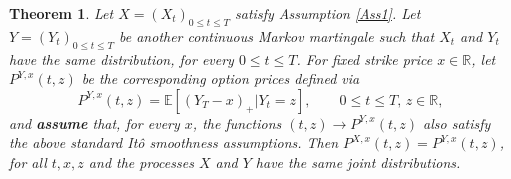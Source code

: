 \documentclass[11pt,a4paper]{article}%
\def\E{{\mathbb E}}
\def\R{{\mathbb R}}
\newtheorem{theorem}{Theorem}[section]
\numberwithin{equation}{section}
\begin{document}


\begin{theorem}\label{baby}
Let $X=(X_t)_{0\le t\le T}$ satisfy Assumption \ref{Ass1}.
Let $Y=(Y_t)_{0\le t\le T}$ be another continuous Markov martingale such that $X_t$ and $Y_t$ have the same distribution, for every $0 \le t \le  T$.
For fixed strike price $x \in \R$, let  $P^{Y,x}(t,z)$ be the corresponding option prices defined via
\begin{equation} \label{condadd'}
P^{Y,x}(t,z) = \E [(Y_T -x)_+|Y_t=z],   \qquad 0 \le t\le T, \, z \in \R,
\end{equation}
and {\bf assume} that, for every $x$, the functions $(t,z) \to P^{Y,x}(t,z)$ also satisfy the above standard It\^o smoothness assumptions.
Then $P^{X,x}(t,z) = P^{Y,x}(t,z)$, for all $t,x,z$ and the processes $X$ and $Y$ have the same joint distributions.
\end{theorem}
\end{document}
